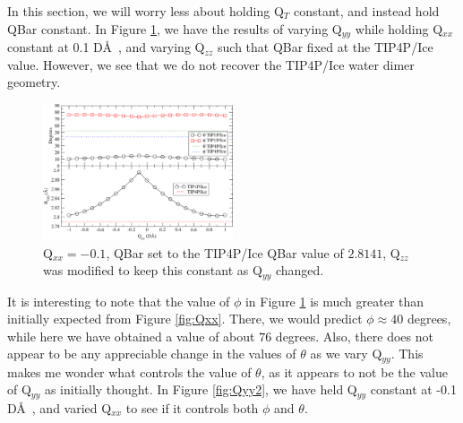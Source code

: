 \documentclass[aps, jcp, prl, reprint, groupedaddress, superscriptaddress, twocolumn]{revtex4-1}
\begin{document}



In this section, we will worry less about holding Q$_T$ constant, and instead
hold QBar constant. In Figure \ref{fig:Qyy}, we have the results of varying
Q$_{yy}$ while holding Q$_{xx}$ constant at 0.1 D\AA~, and varying Q$_{zz}$
such that QBar fixed at the TIP4P/Ice value. However, we see that we do
not recover the TIP4P/Ice water dimer geometry.

\begin{figure}[h!]
\includegraphics[width=0.5\textwidth]{Test19_plot.pdf}
\caption{\label{fig:Qyy} Q$_{xx} = -0.1$, QBar set to the TIP4P/Ice QBar value of $2.8141$, Q$_{zz}$ was modified to keep this constant as Q$_{yy}$ changed.}
\end{figure}

It is interesting to note that the value of $\phi$ in Figure \ref{fig:Qyy} is 
much greater than initially expected from Figure \ref{fig:Qxx}. There, we would
predict $\phi \approx 40$ degrees, while here we have obtained a value of about
$76$ degrees. Also, there does not appear to be any appreciable change in the
values of $\theta$ as we vary Q$_{yy}$. This makes me wonder what controls
the value of $\theta$, as it appears to not be the value of Q$_{yy}$ as 
initially thought. In Figure \ref{fig:Qyy2}, we have held Q$_{yy}$ constant
at -0.1 D\AA~, and varied Q$_{xx}$ to see if it controls both $\phi$ and
$\theta$.
\end{document}
